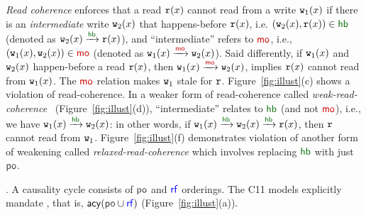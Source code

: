  \emph{Read coherence}  enforces that a read $\mathtt{r}(x)$ cannot read from a write $\mathtt{w}_1(x)$ if 
there is an \emph{intermediate} write $\mathtt{w}_2(x)$ that happens-before $\mathtt{r}(x)$, 
i.e. $(\wt_2(x), \rd(x)) \in \hb$ (denoted as $\wt_2(x) \xra{\hb} \rd(x)$), and ``intermediate'' refers to $\mo$,
i.e.,  $(\wt_1(x),\wt_2(x))\in \mo$ (denoted as $\wt_1(x) \xra{\mo} \wt_2(x)$). Said differently, if $\mathtt{w}_1(x)$ and $\mathtt{w}_2(x)$ happen-before a read $\mathtt{r}(x)$, then $\wt_1(x) \xra{\mo} \wt_2(x)$, implies $\mathtt{r}(x)$ cannot read from $\mathtt{w}_1(x)$. The $\mo$ relation makes $\mathtt{w}_1$ stale for $\mathtt{r}$. Figure~\ref{fig:illust}(c) shows a violation of read-coherence. 
In a weaker form of read-coherence called
\emph{weak-read-coherence}~\cite{Lahav:2022} (Figure~\ref{fig:illust}(d)), 
``intermediate'' relates to $\hb$ (and not $\mo$), i.e., we have $\wt_1(x) \xra{\hb} \wt_2(x)$: in other words, if $\wt_1(x) \xra{\hb} \wt_2(x) \xra{\hb} \rd(x)$, then $\mathtt{r}$ cannot read from $\mathtt{w}_1$. Figure~\ref{fig:illust}(f) demonstrates violation of another form of weakening called \emph{relaxed-read-coherence} which involves replacing $\hb$ with just $\po$.
 
. A causality cycle consists of $\po$ and $\rf$ orderings.
The C11 models explicitly mandate \PORF{} \cite{Lahav:2022,Luo:2021}, that is, 
$\acy(\po \cup \rf)$ (Figure~\ref{fig:illust}(a)). 

